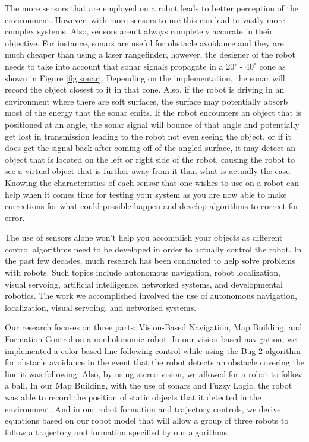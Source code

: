 \documentclass[12pt]{article}
\begin{document}
The more sensors that are employed on a robot leads to better perception of the environment. However, with more sensors to use this can lead to vastly more complex systems. Also, sensors aren't always completely accurate in their objective. For instance, sonars are useful for obstacle avoidance and they are much cheaper than using a laser rangefinder, however, the designer of the robot needs to take into account that sonar signals propagate in a 20$^\circ$ - $40^\circ$ cone as shown in Figure \ref{fig.sonar}. Depending on the implementation, the sonar will record the object closest to it in that cone. Also, if the robot is driving in an environment where there are soft surfaces, the surface may potentially absorb most of the energy that the sonar emits. If the robot encounters an object that is positioned at an angle, the sonar signal will bounce of that angle and potentially get lost in transmission leading to the robot not even seeing the object, or if it does get the signal back after coming off of the angled surface, it may detect an object that is located on the left or right side of the robot, causing the robot to see a virtual object that is further away from it than what is actually the case. Knowing the characteristics of each sensor that one wishes to use on a robot can help when it comes time for testing your system as you are now able to make corrections for what could possible happen and develop algorithms to correct for error.

The use of sensors alone won't help you accomplish your objects as different control algorithms need to be developed in order to actually control the robot. In the past few decades, much research has been conducted to help solve problems with robots. Such topics include autonomous navigation, robot localization, visual servoing, artificial intelligence, networked systems, and developmental robotics. The work we accomplished involved the use of autonomous navigation, localization, visual servoing, and networked systems.

Our research focuses on three parts: Vision-Based Navigation, Map Building, and Formation Control on a nonholonomic robot. In our vision-based navigation, we implemented a color-based line following control while using the Bug 2 algorithm for obstacle avoidance in the event that the robot detects an obstacle covering the line it was following. Also, by using stereo-vision, we allowed for a robot to follow a ball. In our Map Building, with the use of sonars and Fuzzy Logic, the robot was able to record the position of static objects that it detected in the environment. And in our robot formation and trajectory controls, we derive equations based on our robot model that will allow a group of three robots to follow a trajectory and formation specified by our algorithms.
\end{document}
